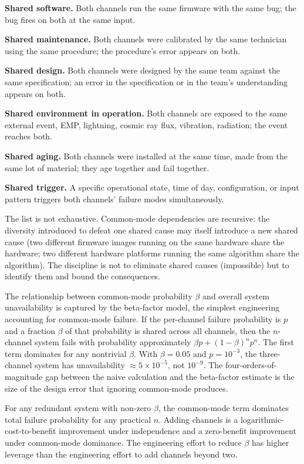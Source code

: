 \textbf{Shared software.} Both channels run the same firmware with the same bug; the bug fires on both at the same input.

\textbf{Shared maintenance.} Both channels were calibrated by the same technician using the same procedure; the procedure's error appears on both.

\textbf{Shared design.} Both channels were designed by the same team against the same specification; an error in the specification or in the team's understanding appears on both.

\textbf{Shared environment in operation.} Both channels are exposed to the same external event, EMP, lightning, cosmic ray flux, vibration, radiation; the event reaches both.

\textbf{Shared aging.} Both channels were installed at the same time, made from the same lot of material; they age together and fail together.

\textbf{Shared trigger.} A specific operational state, time of day, configuration, or input pattern triggers both channels' failure modes simultaneously.

The list is not exhaustive. Common-mode dependencies are recursive: the diversity introduced to defeat one shared cause may itself introduce a new shared cause (two different firmware images running on the same hardware share the hardware; two different hardware platforms running the same algorithm share the algorithm). The discipline is not to eliminate shared causes (impossible) but to identify them and bound the consequences.

The relationship between common-mode probability $\beta$ and overall system unavailability is captured by the beta-factor model, the simplest engineering accounting for common-mode failure. If the per-channel failure probability is $p$ and a fraction $\beta$ of that probability is shared across all channels, then the $n$-channel system fails with probability approximately $\beta p + (1 - \beta)^n p^n$. The first term dominates for any nontrivial $\beta$. With $\beta = 0.05$ and $p = 10^{-3}$, the three-channel system has unavailability $\approx 5 \times 10^{-5}$, not $10^{-9}$. The four-orders-of-magnitude gap between the naive calculation and the beta-factor estimate is the size of the design error that ignoring common-mode produces.

\begin{principle}
For any redundant system with non-zero $\beta$, the common-mode term dominates total failure probability for any practical $n$. Adding channels is a logarithmic-cost-to-benefit improvement under independence and a zero-benefit improvement under common-mode dominance. The engineering effort to reduce $\beta$ has higher leverage than the engineering effort to add channels beyond two.
\end{principle}

